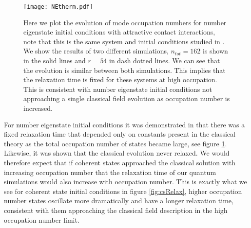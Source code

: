 \documentclass[aps,prd,twocolumn,superscriptaddress]{revtex4-1}
\begin{document}
\begin{figure}
	\texttt{[image: NEtherm.pdf]}
	\caption{ Here we plot the evolution of mode occupation numbers for number eigenstate initial conditions with attractive contact interactions, note that this is the same system and initial conditions studied in \cite{Sikivie2017}. We show the results of two different simulations, $n_{tot}=162$ is shown in the solid lines and $r=54$ in dash dotted lines. We can see that the evolution is similar between both simulations. This implies that the relaxation time is fixed for these systems at high occupation. This is consistent with number eigenstate initial conditions not approaching a single classical field evolution as occupation number is increased.}
	\label{fig:neRelax}
\end{figure}

For number eigenstate initial conditions it was demonstrated in \cite{Sikivie2017} that there was a fixed relaxation time that depended only on constants present in the classical theory as the total occupation number of states became large, see figure \ref{fig:neRelax}. Likewise, it was shown that the classical evolution never relaxed. We would therefore expect that if coherent states approached the classical solution with increasing occupation number that the relaxation time of our quantum simulations would also increase with occupation number. This is exactly what we see for coherent state initial conditions in figure \ref{fig:csRelax}, higher occupation number states oscillate more dramatically and have a longer relaxation time, consistent with them approaching the classical field description in the high occupation number limit.




\end{document}
